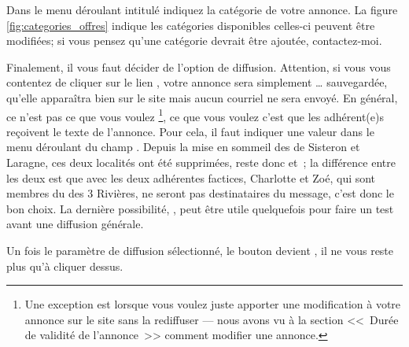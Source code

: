 Dans le menu déroulant intitulé  indiquez la catégorie de votre annonce. La figure \ref{fig:categories_offres} indique les catégories disponibles\; celles-ci peuvent être modifiées; si vous pensez qu'une catégorie devrait être ajoutée, contactez-moi.


\label{sec:sauvegarder_diffuser}

\label{page:choixLocalite}
Finalement, il vous faut décider de l'option de diffusion. Attention, si vous vous contentez de cliquer sur le lien , votre annonce sera simplement … sauvegardée, \cad{} qu’elle apparaîtra bien sur le site mais aucun courriel ne sera envoyé. En général, ce n’est pas ce que vous voulez%
\footnote{Une exception est lorsque vous voulez juste apporter une modification à votre annonce sur le site sans la rediffuser --- nous avons vu à la section  <<~Durée de validité de l'annonce~>>  comment modifier une annonce.},
ce que vous voulez c’est que les adhérent(e)s reçoivent le texte de l’annonce. Pour cela, il faut indiquer une valeur dans le menu déroulant du champ . Depuis la mise en sommeil des \sel{} de Sisteron et  Laragne, ces deux localités ont été supprimées, reste donc  et \,; la différence entre les deux est que avec  les deux adhérentes factices, Charlotte et Zoé, qui sont membres du \sel{} des 3 Rivières, ne seront pas destinataires du message, c'est donc le bon choix. La dernière possibilité, ,  peut être utile quelquefois pour faire un test avant une diffusion générale. 

Un fois le paramètre de diffusion sélectionné, le bouton  devient , il ne vous reste plus qu'à cliquer dessus.

\medskip

